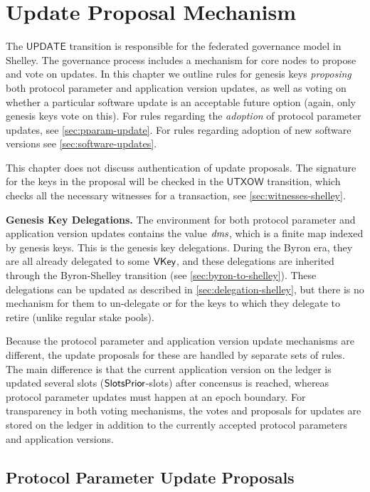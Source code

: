\section{Update Proposal Mechanism}
\label{sec:update}


The $\mathsf{UPDATE}$ transition is responsible for the federated governance model in Shelley.
The governance process includes a mechanism for core nodes to propose and vote on
updates. In this chapter we
outline rules for genesis keys \textit{proposing} both protocol parameter
and application version updates, as well as voting on whether a particular
software update is an acceptable future option (again, only genesis keys vote on this).
For rules regarding the \textit{adoption} of protocol
parameter updates, see \ref{sec:pparam-update}. For rules regarding
adoption of new software versions see \ref{sec:software-updates}.

This chapter does not discuss authentication of update proposals.
The signature for the keys in the proposal will be checked in the
$\mathsf{UTXOW}$ transition, which checks all the necessary witnesses
for a transaction, see \ref{sec:witnesses-shelley}.

\textbf{Genesis Key Delegations.} The environment for both protocol parameter
and application version updates contains
the value $\mathit{dms}$, which is a finite map indexed by genesis keys.
This is the genesis key delegations. During the Byron era, they are all
already delegated to some $\mathsf{VKey}$, and these delegations are inherited
through the Byron-Shelley transition (see \ref{sec:byron-to-shelley}).
These delegations can be updated as described in \ref{sec:delegation-shelley},
but there is no mechanism for them to un-delegate or for the keys to which they delegate
to retire (unlike regular stake pools).

Because the protocol parameter and application version update mechanisms are different, the
update proposals for these are handled by separate sets of rules. The main
difference is that the current application version on the ledger is updated
several slots ($\mathsf{SlotsPrior}$-slots) after concensus is reached, whereas protocol
parameter updates must happen at an epoch boundary.
For transparency in both voting mechanisms, the votes and proposals for updates
are stored
on the ledger in addition to the currently accepted protocol parameters and
application versions.

\subsection{Protocol Parameter Update Proposals}
\label{sec:pp-proposals}


